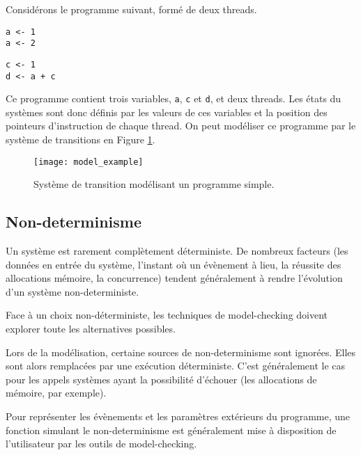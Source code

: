 Considérons le programme suivant, formé de deux threads.

\noindent\begin{minipage}{.45\textwidth}
\begin{lstlisting}[caption=Thread 1, frame=tlrb]
a <- 1
a <- 2
\end{lstlisting}
\end{minipage}\hfill
\begin{minipage}{.45\textwidth}
\begin{lstlisting}[caption=Thread 2,frame=tlrb]
c <- 1
d <- a + c
\end{lstlisting}
\end{minipage}

Ce programme contient trois variables, \lstinline!a!, \lstinline!c! et
\lstinline!d!, et deux threads. Les états du systèmes sont donc définis par les
valeurs de ces variables et la position des pointeurs d'instruction de chaque
thread. On peut modéliser ce programme par le système de transitions en Figure
\ref{fig:model_example}.

\begin{figure}
\begin{center}
\texttt{[image: model\_example]}
\end{center}
\caption{Système de transition modélisant un programme simple.}
\label{fig:model_example}
\end{figure}

\subsection{Non-determinisme}

Un système est rarement complètement déterministe. De nombreux facteurs (les
données en entrée du système, l'instant où un évènement à lieu, la réussite des
allocations mémoire, la concurrence) tendent généralement à rendre l'évolution
d'un système non-deterministe.

Face à un choix non-déterministe, les techniques de model-checking doivent
explorer toute les alternatives possibles.

Lors de la modélisation, certaine sources de non-determinisme sont ignorées.
Elles sont alors remplacées par une exécution déterministe.
C'est généralement le cas pour les appels systèmes ayant la possibilité
d'échouer (les allocations de mémoire, par exemple).

Pour représenter les évènements et les paramètres extérieurs du programme,
une fonction simulant le non-determinisme est généralement mise à disposition
de l'utilisateur par les outils de model-checking.

